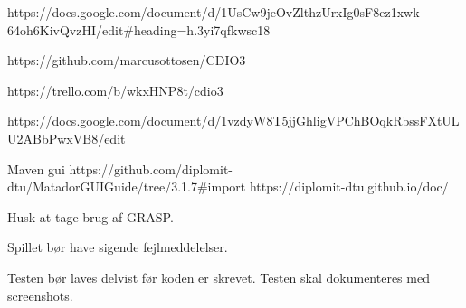 https://docs.google.com/document/d/1UsCw9jeOvZlthzUrxIg0sF8ez1xwk-64oh6KivQvzHI/edit#heading=h.3yi7qfkwsc18

https://github.com/marcusottosen/CDIO3

https://trello.com/b/wkxHNP8t/cdio3

https://docs.google.com/document/d/1vzdyW8T5jjGhligVPChBOqkRbssFXtULU2ABbPwxVB8/edit


Maven gui https://github.com/diplomit-dtu/MatadorGUIGuide/tree/3.1.7#import
https://diplomit-dtu.github.io/doc/


{}


Husk at tage brug af GRASP.


Spillet bør have sigende fejlmeddelelser.


Testen bør laves delvist før koden er skrevet.
Testen skal dokumenteres med screenshots.